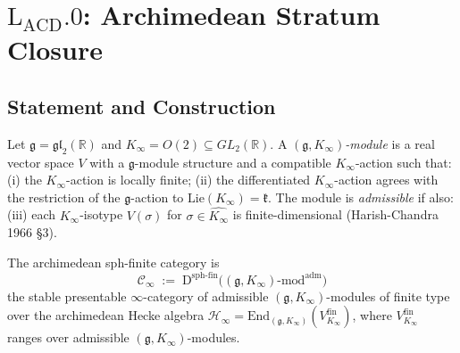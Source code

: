 \section{\(\mathrm{L}_{\mathrm{ACD}}.0\): Archimedean Stratum Closure}
\label{v4-arith:lacd:L0}

\subsection{Statement and Construction}

\begin{definition}
\label{v4-arith:lacd:def:arch-admissible}
Let \(\mathfrak{g} = \mathfrak{gl}_{2}(\mathbb{R})\) and \(K_{\infty} = O(2)
\subseteq GL_{2}(\mathbb{R})\). A \emph{\((\mathfrak{g}, K_{\infty})\)-module}
is a real vector space \(V\) with a \(\mathfrak{g}\)-module structure and
a compatible \(K_{\infty}\)-action such that: (i) the \(K_{\infty}\)-action
is locally finite; (ii) the differentiated \(K_{\infty}\)-action agrees
with the restriction of the \(\mathfrak{g}\)-action to
\(\mathrm{Lie}(K_{\infty}) = \mathfrak{k}\). The module is \emph{admissible}
if also: (iii) each \(K_{\infty}\)-isotype \(V(\sigma)\) for
\(\sigma \in \widehat{K_{\infty}}\) is finite-dimensional (Harish-Chandra
1966 \S3).
\end{definition}

\begin{definition}
\label{v4-arith:lacd:def:arch-sph-fin}
The archimedean sph-finite category is
\begin{equation}
\mathcal{C}_{\infty} \;:=\; \mathrm{D}^{\mathrm{sph\text{-}fin}}
\bigl((\mathfrak{g}, K_{\infty})\text{-mod}^{\mathrm{adm}}\bigr)
\end{equation}
the stable presentable \(\infty\)-category of admissible
\((\mathfrak{g}, K_{\infty})\)-modules of finite type over the
archimedean Hecke algebra
\(\mathcal{H}_{\infty} = \mathrm{End}_{(\mathfrak{g}, K_{\infty})}
(V_{K_{\infty}}^{\mathrm{fin}})\), where \(V_{K_{\infty}}^{\mathrm{fin}}\)
ranges over admissible \((\mathfrak{g}, K_{\infty})\)-modules.
\end{definition}

